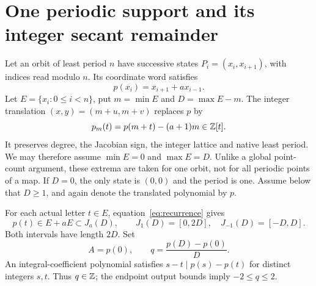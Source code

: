 \section{One periodic support and its integer secant remainder}\label{sec:secant}

Let an orbit of least period $n$ have successive states
$P_i=(x_i,x_{i+1})$, with indices read modulo $n$. Its coordinate
word satisfies
\begin{equation}\label{eq:recurrence}
 p(x_i)=x_{i+1}+a x_{i-1}.
\end{equation}
Let $E=\{x_i:0\le i<n\}$, put $m=\min E$ and
$D=\max E-m$. The integer translation
$(x,y)=(m+u,m+v)$ replaces $p$ by
\begin{equation}\label{eq:translation}
 p_m(t)=p(m+t)-(a+1)m\in\mathbb Z[t].
\end{equation}
It preserves degree, the Jacobian sign, the integer lattice and
native least period. We may therefore assume
$\min E=0$ and $\max E=D$. Unlike a global point-count argument,
these extrema are taken for one orbit, not for all periodic points
of a map. If $D=0$, the only state is $(0,0)$ and the period is one.
Assume below that $D\ge1$, and again denote the translated polynomial
by $p$.

For each actual letter $t\in E$, equation~\eqref{eq:recurrence} gives
\begin{equation}\label{eq:outputs}
 p(t)\in E+aE\subset J_a(D),\qquad
 J_1(D)=[0,2D],\quad J_{-1}(D)=[-D,D].
\end{equation}
Both intervals have length $2D$. Set
\begin{equation}\label{eq:secantparams}
 A=p(0),\qquad q=\frac{p(D)-p(0)}D.
\end{equation}
An integral-coefficient polynomial satisfies
$s-t\mid p(s)-p(t)$ for distinct integers $s,t$.
Thus $q\in\mathbb Z$; the endpoint output bounds imply $-2\le q\le2$.

